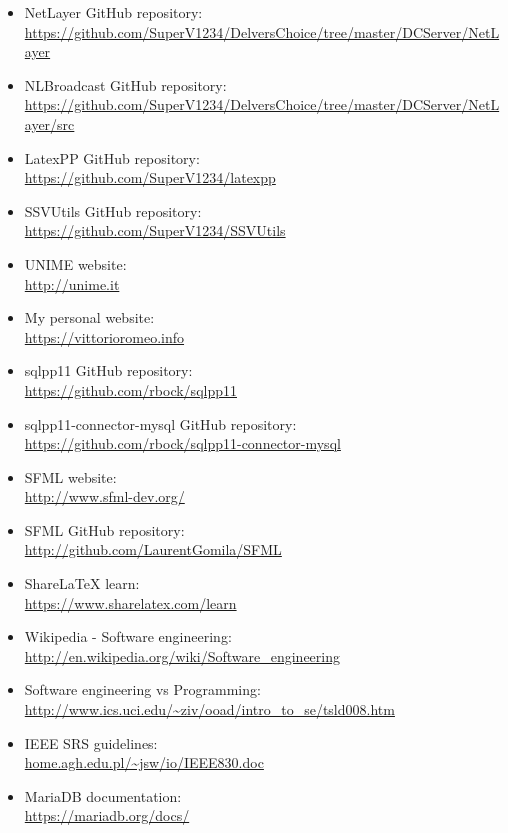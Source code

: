 \documentclass[11pt]{report}
\newcommand{\+}{\discretionary{\mbox{\scriptsize$\hookleftarrow$}}{}{}}
\begin{document}
    \begin{itemize}
        \item NetLayer GitHub repository: \\ \url{https://github.com/SuperV1234/DelversChoice/tree/master/DCServer/NetLayer}
        \item NLBroadcast GitHub repository: \\ \url{https://github.com/SuperV1234/DelversChoice/tree/master/DCServer/NetLayer/src}
        \item LatexPP GitHub repository: \\ \url{https://github.com/SuperV1234/latexpp}
        \item SSVUtils GitHub repository: \\ \url{https://github.com/SuperV1234/SSVUtils}
        \item UNIME website: \\ \url{http://unime.it}
        \item My personal website: \\ \url{https://vittorioromeo.info}

        \item sqlpp11 GitHub repository: \\ \url{https://github.com/rbock/sqlpp11}
        \item sqlpp11-connector-mysql GitHub repository: \\ \url{https://github.com/rbock/sqlpp11-connector-mysql}

        \item SFML website: \\ \url{http://www.sfml-dev.org/}
        \item SFML GitHub repository: \\ \url{http://github.com/LaurentGomila/SFML}

        \item ShareLaTeX learn: \\ \url{https://www.sharelatex.com/learn}
        \item Wikipedia - Software engineering: \\ \url{http://en.wikipedia.org/wiki/Software_engineering}
        \item Software engineering vs Programming: \\ \url{http://www.ics.uci.edu/~ziv/ooad/intro_to_se/tsld008.htm}
        \item IEEE SRS guidelines: \\ \url{home.agh.edu.pl/~jsw/io/IEEE830.doc}
        \item MariaDB documentation: \\ \url{https://mariadb.org/docs/}


\end{itemize}
\end{document}
